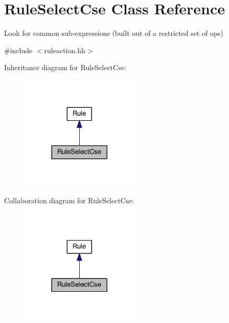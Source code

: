 \hypertarget{class_rule_select_cse}{}\section{Rule\+Select\+Cse Class Reference}
\label{class_rule_select_cse}


Look for common sub-\/expressions (built out of a restricted set of ops)  




{\ttfamily \#include $<$ruleaction.\+hh$>$}



Inheritance diagram for Rule\+Select\+Cse\+:
\nopagebreak
\begin{figure}[H]
\begin{center}
\leavevmode
\includegraphics[width=161pt]{class_rule_select_cse__inherit__graph}
\end{center}
\end{figure}


Collaboration diagram for Rule\+Select\+Cse\+:
\nopagebreak
\begin{figure}[H]
\begin{center}
\leavevmode
\includegraphics[width=161pt]{class_rule_select_cse__coll__graph}
\end{center}
\end{figure}
